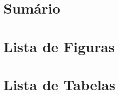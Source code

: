 \chapter*{Sumário}
\renewcommand\contentsname{}
\tableofcontents*

\clearpage

\chapter*{Lista de Figuras}
\renewcommand\listfigurename{}
\listoffigures*
\clearpage

\chapter*{Lista de Tabelas}
\renewcommand\listtablename{}
\listoftables*
\clearpage

\renewcommand\numberline[1]{
	\leftskip -0.7em
	\rightskip 1.6em
	\parindent 0em
	Algorithm \normalfont #1 $-$ }
\makeatother
\listofalgorithms
\clearpage

